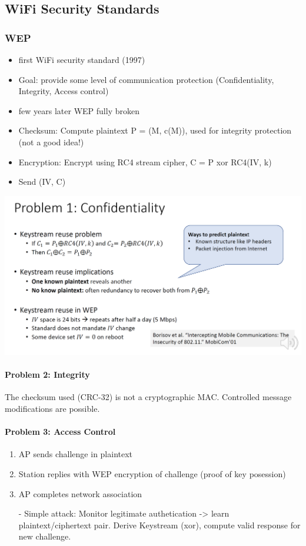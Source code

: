 \subsection{WiFi Security Standards}

\subsubsection{WEP}
\begin{itemize}
    \item first WiFi security standard (1997)
    \item Goal: provide some level of communication protection (Confidentiality, Integrity, Access control)
    \item few years later WEP fully broken
    \item Checksum: Compute plaintext P = (M, c(M)), used for integrity protection (not a good idea!)
    \item Encryption: Encrypt using RC4 stream cipher, C = P xor RC4(IV, k)
    \item Send (IV, C)
\end{itemize}

\begin{minipage}{\linewidth}
    \centering      
    \includegraphics[width=\linewidth]{Figures/L9_wep_problem1.PNG}
\end{minipage}

\paragraph{Problem 2: Integrity}
The checksum used (CRC-32) is not a cryptographic MAC. Controlled message modifications are possible. 

\paragraph{Problem 3: Access Control}
\begin{enumerate}
    \item AP sends challenge in plaintext
    \item Station replies with WEP encryption of challenge (proof of key posession)
    \item AP completes network association
    \item [-] Simple attack: Monitor legitimate authetication -> learn plaintext/ciphertext pair.
    Derive Keystream (xor), compute valid response for new challenge.
\end{enumerate}

